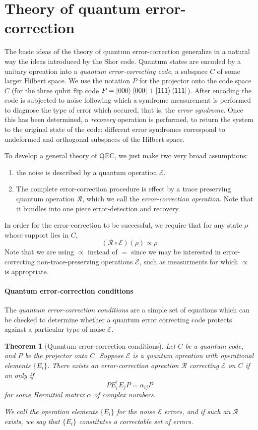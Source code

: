 \documentclass[11pt,a4paper]{article}
\theoremstyle{definition}
\theoremstyle{plain}
\newtheorem{theorem}[definition]{Theorem}
\theoremstyle{remark}
\begin{document}
\section{Theory of quantum error-correction} 
The basic ideas of the theory of quantum error-correction generalize in a natural way the ideas introduced by the Shor code. Quantum states are encoded 
by a unitary opreation into a \emph{quantum error-correcting code}, a subspace $C$ of some larger Hilbert space. We use the notation $P$ for the projector onto 
the code space $C$ (for the three qubit flip code $P = \ket{000} \bra{000} + \ket{111} \bra{111}$). After encoding the code is subjected to noise 
following which a syndrome measurement is performed to diagnose the type of error which occured, that is, the \emph{error syndrome}. 
Once this has been determined, a \emph{recovery} operation is performed, to return the system to the original state of the code: different error syndromes 
correspond to undeformed and orthogonal subspaces of the Hilbert space. 

To develop a general theory of QEC, we just make two very broad assumptions: 
\begin{enumerate}
\item the noise is described by a quantum operation $\mathcal{E}$. 
\item The complete error-correction procedure is effect by a trace preserving quantum operation $\mathcal{R}$, 
which we call the \emph{error-correction operation}. Note that it bundles into one piece error-detection and recovery.  
\end{enumerate}
In order for the error-correction to be successful, we require that for any state $\rho$ whose support lies in $C$, 
$$(\mathcal{R} \circ \mathcal{E}) (\rho) \propto \rho$$
Note that we are using $\propto$ instead of $=$ since we may be interested in error-correcting non-trace-preserving operations $\mathcal{E}$, such as measurments for which $\propto$ is appropriate. 

\paragraph{Quantum error-correction conditions} 
The \emph{quantum error-correction conditions} are a simple set of equations which can be checked to determine whether a quantum error correcting code protects against a particular type of noise $\mathcal{E}$. 

\begin{theorem}[Quantum error-correction conditions] \label{thm:quantum-error-correction-conditions}
Let $C$ be a quantum code, and $P$ be the projector onto $C$. Suppose $\mathcal{E}$ is a quantum opreation with operational elements 
$\{E_i\}$. There exists an error-correction opreation $\mathcal{R}$ correcting $\mathcal{E}$ on $C$ if an only if 
$$P E_i^\dagger E_j P = \alpha_{ij} P$$
for some Hermitial matrix $\alpha$ of complex numbers. 

We call the operation elements $\{E_i\}$ for the noise $\mathcal{E}$ \emph{errors}, and if such an $\mathcal{R}$ exists, 
we say that $\{E_i\}$ constitutes a \emph{correctable set of errors}.
\end{theorem}
\end{document}
